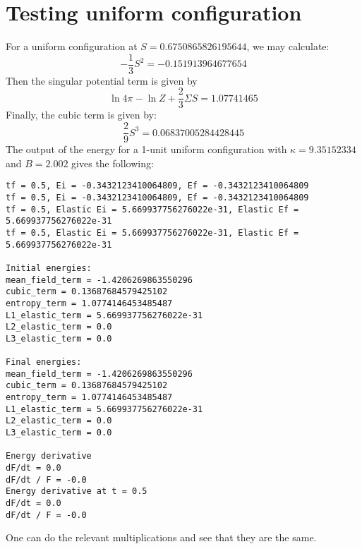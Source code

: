 \documentclass[reqno]{article}
\begin{document}
    \section{Testing uniform configuration}

    For a uniform configuration at $S = 0.6750865826195644$, we may calculate:
    \begin{equation}
        -\frac13 S^2
        =
        -0.151913964677654
    \end{equation}
    Then the singular potential term is given by
    \begin{equation}
        \ln 4\pi - \ln Z + \frac23 \Sigma S = 1.07741465
    \end{equation}
    Finally, the cubic term is given by:
    \begin{equation}
        \frac29 S^3
        =
        0.06837005284428445
    \end{equation}
    The output of the energy for a 1-unit uniform configuration with $\kappa = 9.35152334$ and $B = 2.002$ gives the following:
    \begin{verbatim}
tf = 0.5, Ei = -0.3432123410064809, Ef = -0.3432123410064809
tf = 0.5, Ei = -0.3432123410064809, Ef = -0.3432123410064809
tf = 0.5, Elastic Ei = 5.669937756276022e-31, Elastic Ef = 5.669937756276022e-31
tf = 0.5, Elastic Ei = 5.669937756276022e-31, Elastic Ef = 5.669937756276022e-31

Initial energies:
mean_field_term = -1.4206269863550296
cubic_term = 0.13687684579425102
entropy_term = 1.0774146453485487
L1_elastic_term = 5.669937756276022e-31
L2_elastic_term = 0.0
L3_elastic_term = 0.0

Final energies:
mean_field_term = -1.4206269863550296
cubic_term = 0.13687684579425102
entropy_term = 1.0774146453485487
L1_elastic_term = 5.669937756276022e-31
L2_elastic_term = 0.0
L3_elastic_term = 0.0

Energy derivative
dF/dt = 0.0
dF/dt / F = -0.0
Energy derivative at t = 0.5
dF/dt = 0.0
dF/dt / F = -0.0
    \end{verbatim}
    One can do the relevant multiplications and see that they are the same.
\end{document}
